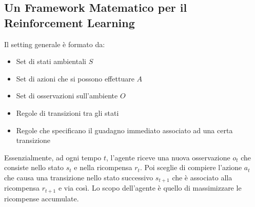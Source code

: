 \documentclass[12pt, a4paper]{article}
\begin{document}
\subsection{Un Framework Matematico per il Reinforcement Learning}
Il setting generale è formato da:
\begin{itemize}
    \item Set di stati ambientali \(S\)
    \item Set di azioni che si possono effettuare \(A\)
    \item Set di osservazioni sull'ambiente \(O\)
    \item Regole di transizioni tra gli stati
    \item Regole che specificano il guadagno immediato associato ad una certa transizione
\end{itemize}

Essenzialmente, ad ogni tempo \(t\), l'agente riceve una nuova osservazione \(o_t\) che consiste nello stato \(s_t\) e nella ricompensa \(r_t\). Poi sceglie di compiere l'azione \(a_t\) che causa una transizione nello stato successivo \(s_{t+1}\) che è associato alla ricompensa \(r_{t+1}\) e via così. Lo scopo dell'agente è quello di massimizzare le ricompense accumulate.\\
\end{document}
